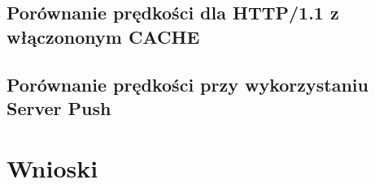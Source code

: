 \documentclass[a4paper,12pt,twoside,openany]{report}
\newcommand{\tech}{\texttt}
\begin{document}
\section{Porównanie prędkości dla HTTP/1.1 z włączononym CACHE}

\section{Porównanie prędkości przy wykorzystaniu Server Push}

\chapter{Wnioski}


%
%

\end{document}
